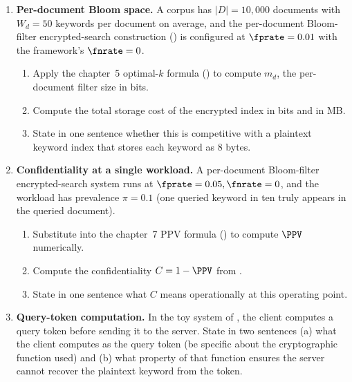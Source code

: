 \begin{enumerate}


\item \exstar
\label{ex:ch18-1}
\textbf{Per-document Bloom space.}
A corpus has $|D| = 10{,}000$ documents with $W_d = 50$ keywords
per document on average, and the per-document Bloom-filter
encrypted-search construction () is
configured at $\fprate = 0.01$ with the framework's
$\fnrate = 0$.
\begin{enumerate}
  \item[(a)] Apply the chapter~5 optimal-$k$ formula
    () to compute $m_d$, the
    per-document filter size in bits.
  \item[(b)] Compute the total storage cost of the encrypted
    index in bits and in MB.
  \item[(c)] State in one sentence whether this is competitive
    with a plaintext keyword index that stores each keyword as
    8 bytes.
\end{enumerate}

\item \exstar
\label{ex:ch18-2}
\textbf{Confidentiality at a single workload.}
A per-document Bloom-filter encrypted-search system runs at
$\fprate = 0.05, \fnrate = 0$, and the workload has prevalence
$\pi = 0.1$ (one queried keyword in ten truly appears in the
queried document).
\begin{enumerate}
  \item[(a)] Substitute into the chapter~7 PPV formula
    () to compute $\PPV$ numerically.
  \item[(b)] Compute the confidentiality $C = 1 - \PPV$ from
    .
  \item[(c)] State in one sentence what $C$ means operationally
    at this operating point.
\end{enumerate}

\item \exstar
\label{ex:ch18-3}
\textbf{Query-token computation.}
In the toy system of , the client computes a
query token before sending it to the server. State in two
sentences (a) what the client computes as the query token (be
specific about the cryptographic function used) and (b) what
property of that function ensures the server cannot recover the
plaintext keyword from the token.


\end{enumerate}
